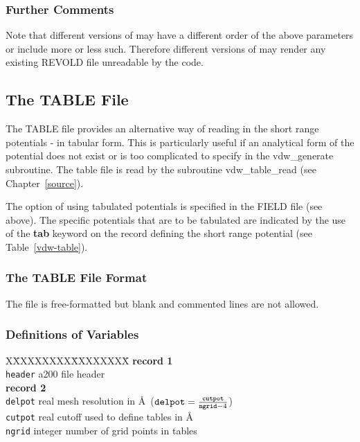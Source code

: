\subsubsection{Further Comments}

Note that different versions of \D may have a different order of
the above parameters or include more or less such.  Therefore
different versions of \D may render any existing REVOLD file
unreadable by the code.

\subsection{The TABLE File}
\label{table-file}

The TABLE file provides an alternative way of reading in the short
range potentials - in tabular form.  This is particularly useful if
an analytical form of the potential does not exist or is too
complicated to specify in the {\sc vdw\_generate} subroutine. The
table file is read by the subroutine {\sc vdw\_table\_read} (see
Chapter~\ref{source}).

The option of using tabulated
potentials is specified in the FIELD file (see above).  The
specific potentials that are to be tabulated are indicated by the
use of the {\bf tab} keyword on the record defining the short
range potential (see Table~\ref{vdw-table}).

\subsubsection{The TABLE File Format}

The file is free-formatted but blank and commented lines are not
allowed.

\subsubsection{Definitions of Variables}

\begin{tabbing}
X\=XXXXXXXX\=XXXXXXXX\=\kill
{\bf record 1} \\
\> {\tt header} \> a200    \> file header \\
{\bf record 2} \\
\> {\tt delpot} \> real    \> mesh resolution in \AA~(${\tt delpot} = \frac{\tt cutpot}{{\tt ngrid}-4}$) \\
\> {\tt cutpot} \> real    \> cutoff used to define tables in \AA \\
\> {\tt ngrid}  \> integer \> number of grid points in tables
\end{tabbing}

